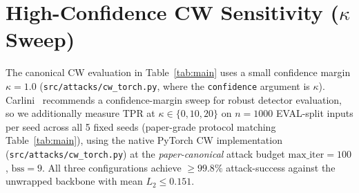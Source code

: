 
\section{High-Confidence CW Sensitivity (\texorpdfstring{$\kappa$}{kappa} Sweep)}
\label{app:strong_cw}

The canonical CW evaluation in Table~\ref{tab:main} uses a small
confidence margin $\kappa{=}1.0$ (\texttt{src/attacks/cw\_torch.py},
where the \texttt{confidence} argument is $\kappa$).
Carlini~\cite{carlini2017adversarial} recommends a
confidence-margin sweep for robust detector evaluation, so we
additionally measure TPR at $\kappa \in \{0, 10, 20\}$ on $n{=}1000$
EVAL-split inputs per seed across all 5 fixed seeds (paper-grade
protocol matching Table~\ref{tab:main}), using the native PyTorch CW
implementation (\texttt{src/attacks/cw\_torch.py}) at the
\emph{paper-canonical} attack budget $\text{max\_iter}{=}100$,
$\text{bss}{=}9$. All three configurations achieve
$\geq 99.8\%$ attack-success against the unwrapped backbone with mean
$L_2 \leq 0.151$.

